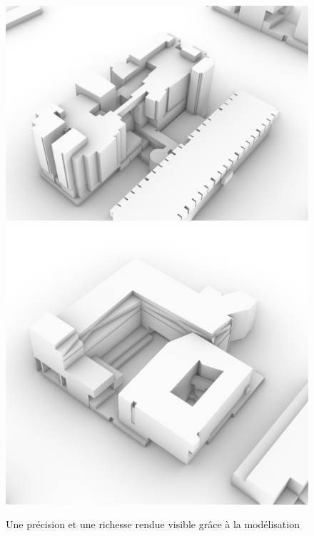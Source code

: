 \documentclass[
  11pt,
  french,
]{article}
\begin{document}
\begin{tcolorbox}
\begin{figure}

{\centering \includegraphics[height=0.3\textheight]{__imgs/3d_zoom_1} \includegraphics[height=0.3\textheight]{__imgs/3d_zoom_2} 

}

\caption[Une précision et une richesse rendue visible grâce à la modélisation  -  Réalisation personnelle]{Une précision et une richesse rendue visible grâce à la modélisation}\label{fig:modele_3d_zoom}
\end{figure}
\end{tcolorbox}
\end{document}
